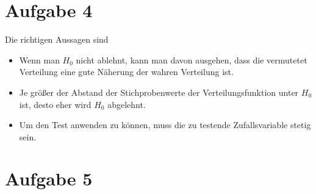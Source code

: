 \documentclass{article}
\begin{document}
	\section*{Aufgabe 4}
	Die richtigen Aussagen sind
	\begin{itemize}
		\item Wenn man $H_0$ nicht ablehnt, kann man davon ausgehen, dass die vermutetet Verteilung eine gute Näherung der wahren Verteilung ist.
		\item Je größer der Abstand der Stichprobenwerte der Verteilungsfunktion unter $H_0$ ist, desto eher wird $H_0$ abgelehnt.
		\item Um den Test anwenden zu können, muss die zu testende Zufallsvariable stetig sein.
	\end{itemize}

	\section*{Aufgabe 5}
\end{document}

